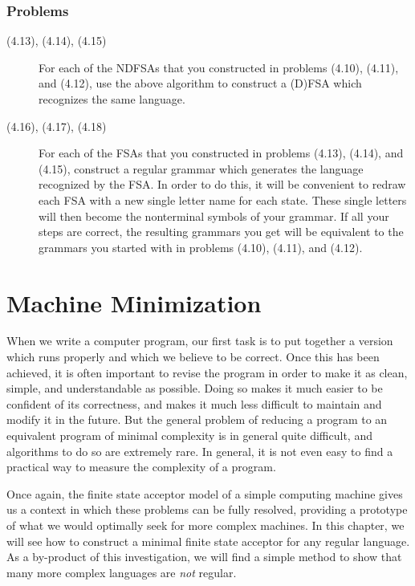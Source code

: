 \documentclass{article}
\begin{document}
\subsubsection*{Problems}

\begin{description}
  \item[(4.13), (4.14), (4.15)] For each of the NDFSAs that you constructed in problems (4.10), (4.11), and (4.12), use the above algorithm to construct a (D)FSA which recognizes the same language.
  \item[(4.16), (4.17), (4.18)] For each of the FSAs that you constructed in problems (4.13), (4.14), and (4.15), construct a regular grammar which generates the language recognized by the FSA. In order to do this, it will be convenient to redraw each FSA with a new single letter name for each state. These single letters will then become the nonterminal symbols of your grammar. If all your steps are correct, the resulting grammars you get will be equivalent to the grammars you started with in problems (4.10), (4.11), and (4.12).
\end{description}




\newpage


\section{Machine Minimization}


When we write a computer program, our first task is to put together a version which runs properly and which we believe to be correct. Once this has been achieved, it is often important to revise the program in order to make it as clean, simple, and understandable as possible. Doing so makes it much easier to be confident of its correctness, and makes it much less difficult to maintain and modify it in the future. But the general problem of reducing a program to an equivalent program of minimal complexity is in general quite difficult, and algorithms to do so are extremely rare. In general, it is not even easy to find a practical way to measure the complexity of a program.

Once again, the finite state acceptor model of a simple computing machine gives us a context in which these problems can be fully resolved, providing a prototype of what we would optimally seek for more complex machines. In this chapter, we will see how to construct a minimal finite state acceptor for any regular language. As a by-product of this investigation, we will find a simple method to show that many more complex languages are \emph{not} regular.
\end{document}
